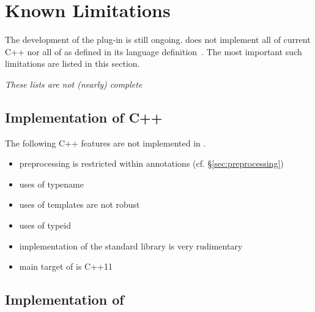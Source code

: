 \chapter{Known Limitations}

The development of the \fclang plug-in is still ongoing.
\fclang does not implement all of current C++ nor all of 
\acslpp as defined in its language definition~\cite{acslpp}.
The most important such limitations are listed in this section.

\textit{These lists are not (nearly) complete}

\section{Implementation of C++}

The following C++ features are not implemented in \acslpp.
\begin{itemize}
\item preprocessing is restricted within \acslpp annotations (cf. \S\ref{sec:preprocessing})
\item uses of typename
\item uses of templates are not robust
\item uses of typeid
\item implementation of the standard library is very rudimentary
\item main target of \fcl is C++11
\end{itemize}

\section{Implementation of \acslpp}

